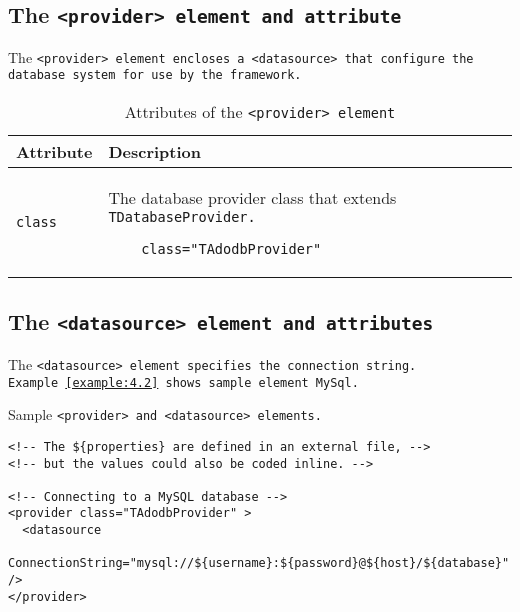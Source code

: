\subsection{The \tt{<provider>} element and attribute}
The \tt{<provider>} element encloses a \tt{<datasource>} that configure the
database system for use by the framework.
\begin{table}[!hpt]
\caption{Attributes of the \tt{<provider>} element} \label{table:4.3}
\centering
\begin{tabular}{|l|l|}
 \hline
 \textbf{Attribute} & \textbf{Description} \\
 \hline
 \tt{class} &
 \begin{minipage}{0.7\textwidth}\vspace{2mm}
    The database provider class that extends
    \tt{TDatabaseProvider}.
    \vspace{-3mm}\begin{verbatim}
    class="TAdodbProvider"
    \end{verbatim}\vspace{-5mm}
  \end{minipage}
  \\
  \hline
  \end{tabular}
\end{table}

\subsection{The \tt{<datasource>} element and attributes}
The \tt{<datasource>} element specifies the connection string.
Example~\ref{example:4.2} shows sample element MySql.

\begin{example}\label{example:4.2}
Sample \tt{<provider>} and \tt{<datasource>} elements.
\begin{verbatim}
<!-- The ${properties} are defined in an external file, -->
<!-- but the values could also be coded inline. -->

<!-- Connecting to a MySQL database -->
<provider class="TAdodbProvider" >
  <datasource
    ConnectionString="mysql://${username}:${password}@${host}/${database}" />
</provider>
\end{verbatim}
\end{example}

